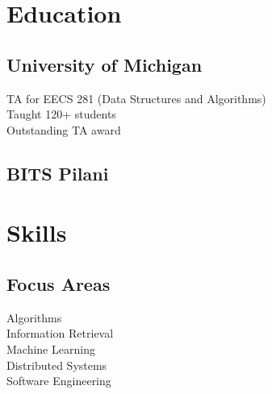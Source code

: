\documentclass[]{resume-openfont}
\begin{document}
 

%
%
\lastupdated

%
%
%
%
\begin{minipage}[t]{0.25\textwidth} 


\section{Education} 

\subsection{University of Michigan}
\sectionsep
\textbullet{} TA for EECS 281 (Data Structures and Algorithms)\\
\textbullet{} Taught 120+ students\\
\textbullet{} Outstanding TA award
\sectionsep

\subsection{BITS Pilani}
\sectionsep

\section{Skills}
\subsection{Focus Areas}
\textbullet{} Algorithms \\
\textbullet{} Information Retrieval \\
\textbullet{} Machine Learning \\
\textbullet{} Distributed Systems \\
\textbullet{} Software Engineering\\
\sectionsep


\end{minipage}
\end{document}
